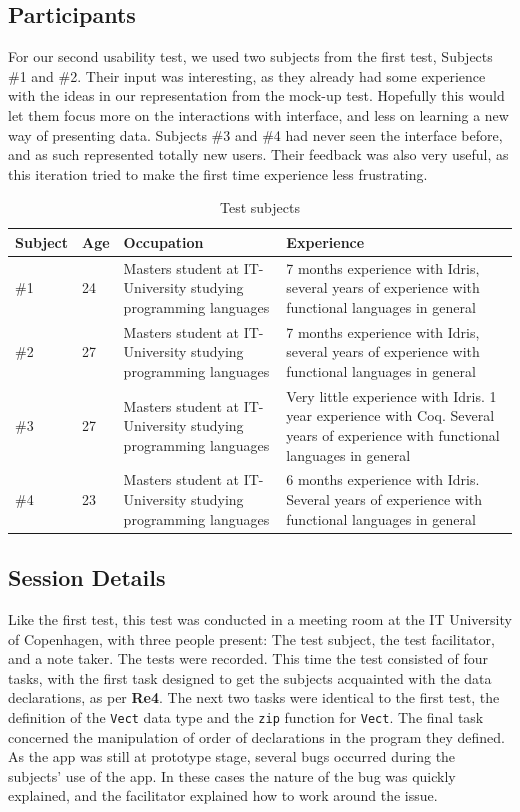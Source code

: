 \subsection{Participants}
For our second usability test, we used two subjects from the first test,
Subjects \#1 and \#2. Their input was interesting, as they already had some
experience with the ideas in our representation from the mock-up test.
Hopefully this would let them focus more on the interactions with interface,
and less on learning a new way of presenting data. Subjects \#3 and \#4 had
never seen the interface before, and as such represented totally new users.
Their feedback was also very useful, as this iteration tried to make the first
time experience less frustrating.

\begin{table}[ht]
\centering
\begin{tabular}{| l | l | p{5cm} | p{5cm} |}
\hline
Subject & Age & Occupation & Experience \\ \hline
\#1 & 24 & Masters student at IT-University studying programming languages & 7 months experience with Idris, several years of experience with functional languages in general \\ \hline
\#2 & 27 & Masters student at IT-University studying programming languages & 7 months experience with Idris, several years of experience with functional languages in general \\ \hline
\#3 & 27 & Masters student at IT-University studying programming languages & Very little experience with Idris. 1 year experience with Coq. Several years of experience with functional languages in general \\ \hline
\#4 & 23 & Masters student at IT-University studying programming languages & 6 months experience with Idris. Several years of experience with functional languages in general \\ \hline
\end{tabular}
\caption{Test subjects}
\label{table:second_test_subjects}
\end{table}

\subsection{Session Details}
Like the first test, this test was conducted in a meeting room at the IT
University of Copenhagen, with three people present: The test subject, the test facilitator,
and a note taker. The tests were recorded. This time the test consisted of four
tasks, with the first task designed to get the subjects acquainted with the
data declarations, as per \textbf{Re4}. The next two tasks were identical to the first test, the
definition of the \texttt{Vect} data type and the \texttt{zip} function for
\texttt{Vect}. The final task concerned the manipulation of order of
declarations in the program they defined. As the app was still at prototype
stage, several bugs occurred during the subjects' use of the app. In these
cases the nature of the bug was quickly explained, and the facilitator
explained how to work around the issue.

